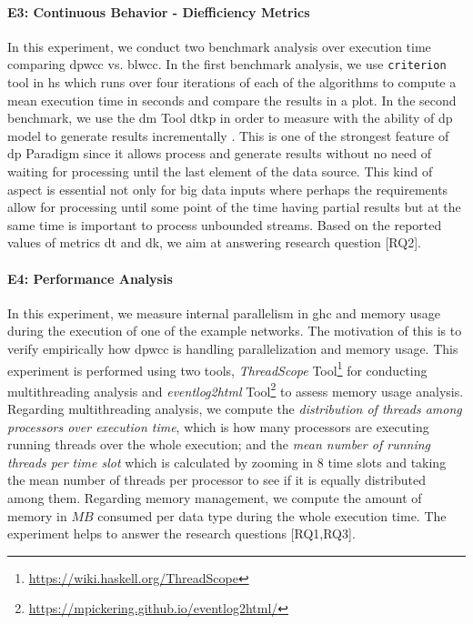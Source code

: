 \paragraph{E3: Continuous Behavior - Diefficiency Metrics}
In this experiment, we conduct two benchmark analysis over execution time comparing \acrshort{dpwcc} vs. \acrshort{blwcc}. 
In the first benchmark analysis, we use \texttt{criterion} tool in \acrshort{hs} which runs over four iterations of each of the algorithms to compute a mean execution time in seconds and compare the results in a plot. 
In the second benchmark, we use the \acrfull{dm} Tool \acrshort{dtkp} in order to measure with the ability of \acrshort{dp} model to generate results incrementally \cite{diefpaper}. 
This is one of the strongest feature of \acrshort{dp} Paradigm since it allows process and generate results without no need of waiting for processing until the last element of the data source. 
This kind of aspect is essential not only for big data inputs where perhaps the requirements allow for processing until some point of the time having partial results but at the same time is important to process unbounded streams.
Based on the reported values of metrics \acrshort{dt} and \acrshort{dk}, we aim at answering research question [RQ2].

\paragraph{E4: Performance Analysis}
In this experiment, we measure internal parallelism in \acrshort{ghc} and memory usage during the execution of one of the example networks. 
The motivation of this is to verify empirically how \acrshort{dpwcc} is handling parallelization and memory usage. 
This experiment is performed using two tools, \textit{ThreadScope} Tool\footnote{\url{https://wiki.haskell.org/ThreadScope}} for conducting multithreading analysis and \textit{eventlog2html} Tool\footnote{\url{https://mpickering.github.io/eventlog2html/}} to assess memory usage analysis. 
Regarding multithreading analysis, we compute the \emph{distribution of threads among processors over execution time}, which is how many processors are executing running threads over the whole execution; and the \emph{mean number of running threads per time slot} which is calculated by zooming in $8$ time slots and taking the mean number of threads per processor to see if it is equally distributed among them. 
Regarding memory management, we compute the amount of memory in $MB$ consumed per data type during the whole execution time. 
The experiment helps to answer the research questions [RQ1,RQ3].

